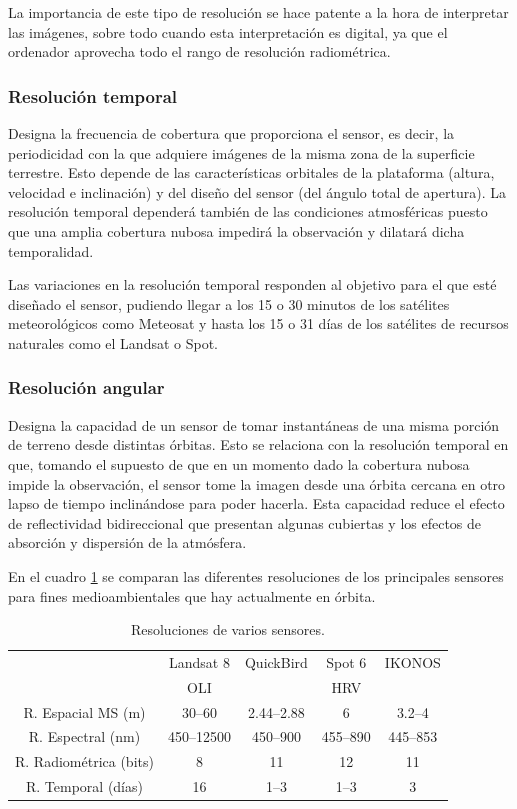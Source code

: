 La importancia de este tipo de resolución se hace patente a la hora de interpretar las imágenes, sobre todo cuando esta interpretación es digital, ya que el ordenador aprovecha todo el rango de resolución radiométrica.

\subsubsection{Resolución temporal}
Designa la frecuencia de cobertura que proporciona el sensor, es decir, la periodicidad con la que adquiere imágenes de la misma zona de la superficie terrestre. Esto depende de las características orbitales de la plataforma (altura, velocidad e inclinación) y del diseño del sensor (del ángulo total de apertura). La resolución temporal dependerá también de las condiciones atmosféricas puesto que una amplia cobertura nubosa impedirá la observación y dilatará dicha temporalidad.\Sep

Las variaciones en la resolución temporal responden al objetivo para el que esté diseñado el sensor, pudiendo llegar a los 15 o 30 minutos de los satélites meteorológicos como Meteosat y hasta los 15 o 31 días de los satélites de recursos naturales como el Landsat o Spot.

\subsubsection{Resolución angular}
Designa la capacidad de un sensor de tomar instantáneas de una misma porción de terreno desde distintas órbitas. Esto se relaciona con la resolución temporal en que, tomando el supuesto de que en un momento dado la cobertura nubosa impide la observación, el sensor tome la imagen desde una órbita cercana en otro lapso de tiempo inclinándose para poder hacerla. Esta capacidad reduce el efecto de reflectividad bidireccional que presentan algunas cubiertas y los efectos de absorción y dispersión de la atmósfera.\Sep

En el cuadro \ref{tab:resoluciones} se comparan las diferentes resoluciones de los principales sensores para fines medioambientales que hay actualmente en órbita.

\begin{table}[ht]
	\centering
	\caption[Resoluciones de varios sensores]{Resoluciones de varios sensores.}
	\begin{tabular}{@{}ccccc@{}}
	\toprule[0.4mm]
	& Landsat 8 & QuickBird & Spot 6 & IKONOS \\
	& OLI & & HRV & \\
	\midrule
	R. Espacial MS (m) & 30--60 & 2.44--2.88 & 6 & 3.2--4 \\
	R. Espectral (nm) & 450--12500 & 450--900 & 455--890 & 445--853 \\
	R. Radiométrica (bits) & 8 & 11 & 12 & 11 \\
	R. Temporal (días) & 16 & 1--3 & 1--3 & 3 \\
	\bottomrule[0.4mm]
	\end{tabular}
	\label{tab:resoluciones}
\end{table}

